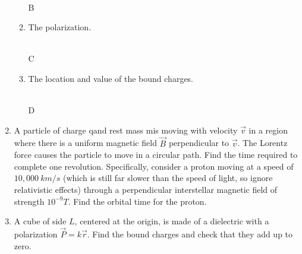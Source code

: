 \documentclass[fleqn]{article}
\begin{document}
\begin{enumerate}
\begin{enumerate}
        \textcolor{hwColor}{
          \\
          B
        }

      \item The polarization.

        \textcolor{hwColor}{
          \\
          C
        }

      \item The location and value of the bound charges.

        \textcolor{hwColor}{
          \\
          D
        }
  
    \end{enumerate}

    \item A particle of charge qand rest mass mis moving with velocity $\overrightarrow{v}$ in a region where there 
    is a uniform magnetic field $\overrightarrow{B}$ perpendicular to $\overrightarrow{v}$. The Lorentz force causes 
    the particle to move in a circular path. Find the time required to complete one revolution. Specifically, consider
    a proton moving at a speed of $10,000 ~ km/s$ (which is still far slower than the speed of light, so ignore relativistic 
    effects) through a perpendicular interstellar magnetic field of strength $10^{-9} T$. Find the orbital time for the proton.


    \item A cube of side $L$, centered at the origin, is made of a dielectric with a polarization $\overrightarrow{P}=k \overrightarrow{r}$.
    Find the bound charges and check that they add up to zero.


\end{enumerate}
\end{document}
